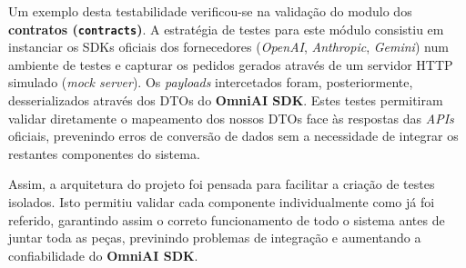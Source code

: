     Um exemplo desta testabilidade verificou-se na validação do modulo dos \textbf{contratos (\texttt{contracts})}. A estratégia de testes para este módulo consistiu em instanciar os SDKs oficiais dos fornecedores (\textit{OpenAI}, \textit{Anthropic}, \textit{Gemini}) num ambiente de testes e capturar os pedidos gerados através de um servidor HTTP simulado (\textit{mock server}). Os \textit{payloads} intercetados foram, posteriormente, desserializados através dos DTOs do \textbf{OmniAI SDK}. Estes testes permitiram validar diretamente o mapeamento dos nossos DTOs face às respostas das \textit{APIs} oficiais, prevenindo erros de conversão de dados sem a necessidade de integrar os restantes componentes do sistema.

    Assim, a arquitetura do projeto foi pensada para facilitar a criação de testes isolados. Isto permitiu validar cada componente individualmente como já foi referido, garantindo assim o correto funcionamento de todo o sistema antes de juntar toda as peças, previnindo problemas de integração e aumentando a confiabilidade do \textbf{OmniAI SDK}.